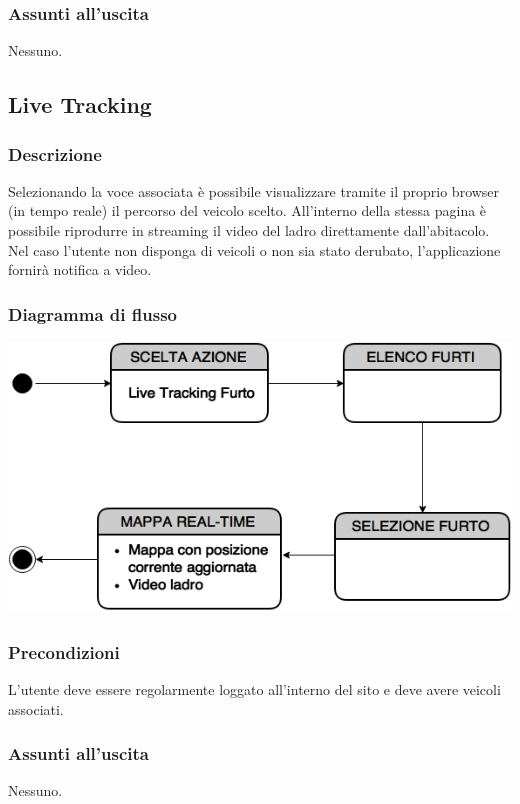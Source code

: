 \documentclass[a4paper,12pt]{article}
\begin{document}
\subsubsection{Assunti all'uscita}
Nessuno.

\pagebreak

\subsection{Live Tracking}
\subsubsection{Descrizione}
Selezionando la voce associata è possibile visualizzare tramite il proprio browser (in tempo reale) il percorso del veicolo scelto. All'interno della stessa pagina è possibile riprodurre in streaming il video del ladro direttamente dall'abitacolo. Nel caso l'utente non disponga di veicoli o non sia stato derubato, l'applicazione fornirà notifica a video.
\subsubsection{Diagramma di flusso}

\begin{center}
\includegraphics[scale=0.7]{Tracking.png}
\end{center}
\subsubsection{Precondizioni}
L'utente deve essere regolarmente loggato all'interno del sito e deve avere veicoli associati.
\subsubsection{Assunti all'uscita}
Nessuno.
\end{document}
